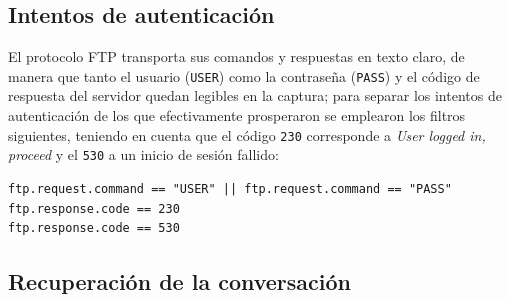 
\begin{analisis}
\end{analisis}

\begin{respuesta}
\end{respuesta}

\begin{respuesta}
\end{respuesta}

\subsection{Intentos de autenticación}

El protocolo FTP \cite{rfc959} transporta sus comandos y respuestas en texto claro, de manera que tanto el usuario (\texttt{USER}) como la contraseña (\texttt{PASS}) y el código de respuesta del servidor quedan legibles en la captura; para separar los intentos de autenticación de los que efectivamente prosperaron se emplearon los filtros siguientes, teniendo en cuenta que el código \texttt{230} corresponde a \emph{User logged in, proceed} y el \texttt{530} a un inicio de sesión fallido:

\begin{lstlisting}
ftp.request.command == "USER" || ftp.request.command == "PASS"
ftp.response.code == 230
ftp.response.code == 530
\end{lstlisting}


\begin{analisis}
\end{analisis}

\begin{respuesta}
\end{respuesta}

\subsection{Recuperación de la conversación}

